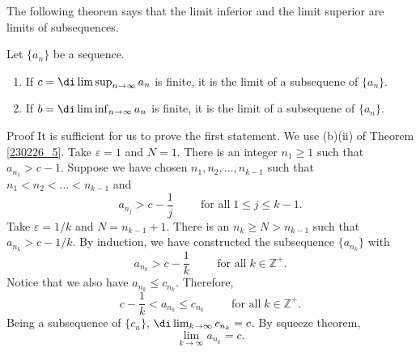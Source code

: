  The following theorem says that the limit inferior and the limit superior are limits of subsequences.

\begin{theorem}[label=230226_9]{}Let $\{a_n\}$ be a sequence.
\begin{enumerate}[1.]

\item If $c=\di\limsup_{n\to\infty}a_n$ is finite, it is the limit of a subsequene of $\{a_n\}$.
\item If $b=\di\liminf_{n\to\infty}a_n$ is finite,  it is the limit of a subsequene of $\{a_n\}$.
\end{enumerate}
\end{theorem}
\begin{myproof}{Proof}
It is sufficient for us to prove the first statement.
We use (b)(ii) of Theorem \ref{230226_5}. Take $\varepsilon=1$ and $N=1$. There is an integer $n_1\geq 1$ such that $a_{n_1}>c-1$.  
Suppose we have chosen $n_1, n_2, \ldots, n_{k-1}$ such that 
$n_1<n_2<\ldots<n_{k-1}$ and 
\[ a_{n_j}>c-\frac{1}{j}\hspace{1cm}\text{for all}\;1\leq j\leq k-1.\]Take $\varepsilon=1/k$ and $N=n_{k-1}+1$. There is an $n_{k}\geq N>n_{k-1}$ such that  $a_{n_k}>c-1/k$.  
 By induction, we have constructed the subsequence $\{a_{n_k}\}$ with 
\[ a_{n_k}>c-\frac{1}{k}\hspace{1cm}\text{for all}\;k\in\mathbb{Z}^+.\]Notice that we also have $a_{n_k}\leq c_{n_k}$. Therefore,
\[c-\frac{1}{k}<a_{n_k}\leq c_{n_k}\hspace{1cm}\text{for all}\;k\in\mathbb{Z}^+.\] Being a subsequence of $\{c_n\}$, $\di\lim_{k\to\infty}c_{n_k}=c$.
By squeeze theorem,
\[\lim_{k\to\infty}a_{n_k}=c.\]

\end{myproof}
